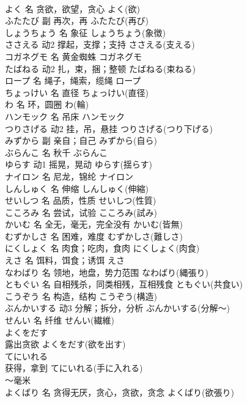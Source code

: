 \documentclass[8pt]{extreport}
\begin{document}
\begin{CJK}{UTF8}{min}
\\	よく	名	贪欲，欲望，贪心	よく(欲)	
\\	ふたたび	副	再次，再	ふたたび(再び)	
\\	しょうちょう	名	象征	しょうちょう(象徴)	
\\	ささえる	动2	撑起，支撑；支持	ささえる(支える)	
\\	コガネグモ	名	黄金蜘蛛	コガネグモ	
\\	たばねる	动2	扎，束，捆；整顿	たばねる(束ねる)	
\\	ロープ	名	绳子，绳索，缆绳	ロープ	
\\	ちょっけい	名	直径	ちょっけい(直径)	
\\	わ	名	环，圆圈	わ(輪)	
\\	ハンモック	名	吊床	ハンモック	
\\	つりさげる	动2	挂，吊，悬挂	つりさげる(つり下げる)	
\\	みずから	副	亲自；自己	みずから(自ら)	
\\	ぶらんこ	名	秋千	ぶらんこ	
\\	ゆらす	动1	摇晃，晃动	ゆらす(揺らす)	
\\	ナイロン	名	尼龙，锦纶	ナイロン	
\\	しんしゅく	名	伸缩	しんしゅく(伸縮)	
\\	せいしつ	名	品质，性质	せいしつ(性質)	
\\	こころみ	名	尝试，试验	こころみ(試み)	
\\	かいむ	名	全无，毫无，完全没有	かいむ(皆無)	
\\	むずかしさ	名	困难，难度	むずかしさ(難しさ)	
\\	にくしょく	名	肉食；吃肉，食肉	にくしょく(肉食)	
\\	えさ	名	饵料，饵食；诱饵	えさ	
\\	なわばり	名	领地，地盘，势力范围	なわばり(縄張り)	
\\	ともぐい	名	自相残杀，同类相残，互相残食	ともぐい(共食い)	
\\	こうぞう	名	构造，结构	こうぞう(構造)	
\\	ぶんかいする	动3	分解；拆分，分析	ぶんかいする(分解～)	
\\	せんい	名	纤维	せんい(繊維)	
\\	よくをだす	
\\	露出贪欲	よくをだす(欲を出す)	
\\	てにいれる	
\\	获得，拿到	てにいれる(手に入れる)	
\\	～毫米	
\\	よくばり	名	贪得无厌，贪心，贪欲，贪念	よくばり(欲張り)	

\end{CJK}
\end{document}
